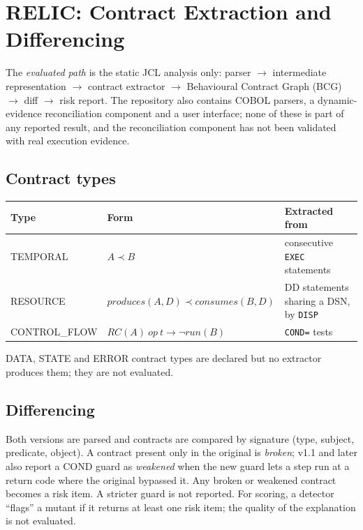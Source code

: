 \section{RELIC: Contract Extraction and Differencing}
\label{sec:arch}

The \emph{evaluated path} is the static JCL analysis only:
parser $\rightarrow$ intermediate representation $\rightarrow$ contract
extractor $\rightarrow$ Behavioural Contract Graph (BCG) $\rightarrow$ diff
$\rightarrow$ risk report. The repository also contains COBOL parsers, a
dynamic-evidence reconciliation component and a user interface; none of these
is part of any reported result, and the reconciliation component has not been
validated with real execution evidence.

\subsection{Contract types}
\begin{center}
\begin{tabular}{@{}lll@{}}
\toprule
Type & Form & Extracted from \\
\midrule
TEMPORAL & $A \prec B$ & consecutive \texttt{EXEC} statements \\
RESOURCE & $\mathit{produces}(A,D) \prec \mathit{consumes}(B,D)$ & DD statements sharing a DSN, by \texttt{DISP} \\
CONTROL\_FLOW & $\mathit{RC}(A)\ \mathit{op}\ t \rightarrow \neg\mathit{run}(B)$ & \texttt{COND=} tests \\
\bottomrule
\end{tabular}
\end{center}
DATA, STATE and ERROR contract types are declared but no extractor produces
them; they are not evaluated.

\subsection{Differencing}
Both versions are parsed and contracts are compared by signature
(type, subject, predicate, object). A contract present only in the original is
\emph{broken}; v1.1 and later also report a COND guard as \emph{weakened} when the
new guard lets a step run at a return code where the original bypassed it. Any
broken or weakened contract becomes a risk item. A stricter guard is not
reported. For scoring, a detector ``flags'' a mutant if it returns at least one
risk item; the quality of the explanation is not evaluated.

